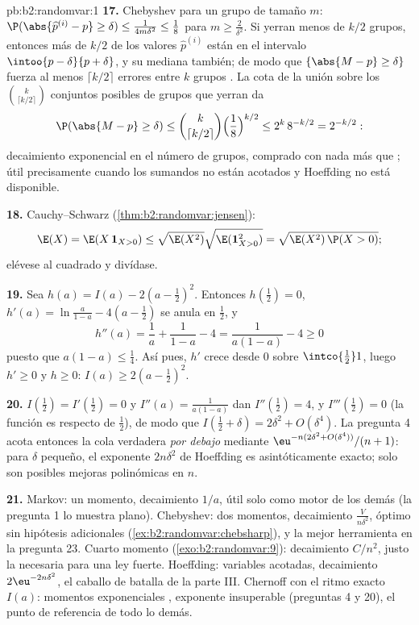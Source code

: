 \begin{solution}{pb:b2:randomvar:1}
\textbf{17.} Chebyshev para un grupo de tamaño $m$: $\P(\abs{
\widehat p^{(i)} - p} \geq \delta) \leq \frac{1}{4m\delta^2} \leq
\frac18$ para $m \geq \frac2{\delta^2}$. Si yerran menos de $k/2$
grupos, entonces más de $k/2$ de los valores $\widehat p^{(i)}$ están
en el intervalo  $\intoo{p - \delta}{p + \delta}$, y su
mediana también; de modo que $\{\abs{M - p} \geq \delta\}$ fuerza al
menos $\lceil k/2\rceil$ errores entre $k$ grupos . La
cota de la unión sobre los $\binom k{\lceil k/2\rceil}$ conjuntos
posibles de grupos que yerran da
\[
\P(\abs{M - p} \geq \delta)
\leq \binom{k}{\lceil k/2\rceil}
\Bigl(\frac18\Bigr)^{k/2}
\leq 2^k\,8^{-k/2} = 2^{-k/2} :
\]
decaimiento exponencial en el número de grupos, comprado con nada más
que ; útil precisamente cuando los sumandos no están
acotados y Hoeffding no está disponible.

\textbf{18.} Cauchy--Schwarz (\cref{thm:b2:randomvar:jensen}):
\[
\E(X) = \E(X\,\mathbf 1_{X>0})
\leq \sqrt{\E(X^2)}\sqrt{\E(\mathbf 1_{X>0}^2)}
= \sqrt{\E(X^2)\,\P(X > 0)} ;
\]
elévese al cuadrado y divídase.

\textbf{19.} Sea $h(a) = I(a) - 2(a - \tfrac12)^2$. Entonces
$h(\tfrac12) = 0$, $h'(a) = \ln\frac a{1-a} - 4(a - \tfrac12)$ se
anula en $\tfrac12$, y
\[
h''(a) = \frac1a + \frac1{1-a} - 4 = \frac{1}{a(1-a)} - 4
\geq 0
\]
puesto que $a(1-a) \leq \frac14$. Así pues, $h'$ crece desde $0$
sobre $\intco{\frac12}1$, luego $h' \geq 0$ y $h \geq 0$: $I(a) \geq
2(a - \tfrac12)^2$.

\textbf{20.} $I(\tfrac12) = I'(\tfrac12) = 0$ y $I''(a) =
\frac1{a(1-a)}$ dan $I''(\tfrac12) = 4$, y $I'''(\tfrac12) = 0$ (la
función es  respecto de $\tfrac12$), de modo que
$I(\tfrac12 + \delta) = 2\delta^2 + O(\delta^4)$. La pregunta 4 acota
entonces la cola verdadera \emph{por debajo} mediante
$\eu^{-n(2\delta^2 + O(\delta^4))}/(n+1)$: para $\delta$ pequeño, el
exponente $2n\delta^2$ de Hoeffding es asintóticamente exacto; solo
son posibles mejoras polinómicas en $n$.

\textbf{21.} Markov: un momento, decaimiento $1/a$, útil solo como
motor de los demás (la pregunta 1 lo muestra plano). Chebyshev: dos
momentos, decaimiento $\frac{V}{n\delta^2}$, óptimo sin hipótesis
adicionales (\cref{ex:b2:randomvar:chebsharp}), y la mejor
herramienta en la pregunta 23. Cuarto momento
(\cref{exo:b2:randomvar:9}): decaimiento $C/n^2$, justo la
 necesaria para una ley fuerte. Hoeffding: variables
acotadas, decaimiento $2\eu^{-2n\delta^2}$, el caballo de batalla de
la parte III. Chernoff con el ritmo exacto $I(a)$: momentos
exponenciales , exponente insuperable (preguntas 4 y 20), el
punto de referencia de todo lo demás.


\end{solution}
